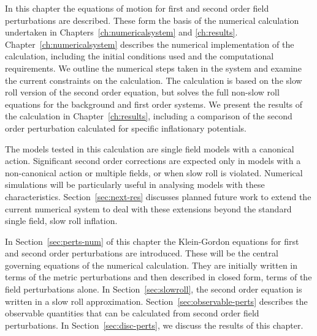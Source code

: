 In this chapter the equations of motion for first and second order field
perturbations are described. These form the basis of the numerical calculation
undertaken in Chapters~\ref{ch:numericalsystem} and \ref{ch:results}.
Chapter~\ref{ch:numericalsystem} describes the numerical implementation of the
calculation, including the initial conditions used and the
computational requirements. We outline the numerical steps
taken in the system and examine the current constraints
on the calculation. The calculation is based on the slow roll version of the second
order equation, but solves the full non-slow roll equations for the
background and first order systems.
% 
We present the results of the calculation
in Chapter~\ref{ch:results}, including a comparison of the second
order perturbation calculated for specific inflationary potentials. 

%
% 
The models tested in this calculation are single field models with a canonical
action. Significant second order corrections
are expected only in models with a non-canonical action or multiple fields, or
when slow roll is violated. Numerical simulations will be particularly
useful in analysing models with these characteristics.
Section~\ref{sec:next-res} discusses planned future work to extend the current
numerical system to deal with these extensions beyond the standard single field, slow
roll inflation.


In Section~\ref{sec:perts-num} of this chapter the Klein-Gordon equations
for first and second order perturbations are introduced. These will be the central
governing equations of the numerical calculation. They are
initially written in
terms of the metric perturbations and
then described in closed form, \iec terms of the field perturbations
alone. In
Section~\ref{sec:slowroll}, the second order equation is written in a slow roll
approximation.
% 
Section~\ref{sec:observable-perts} describes the observable quantities that can be
calculated from second order field perturbations. In Section~\ref{sec:disc-perts}, we
discuss the results of this chapter.




